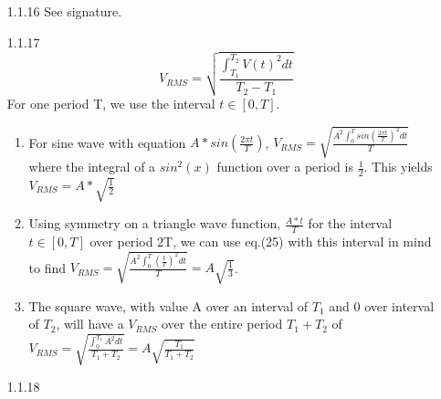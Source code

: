\documentclass{article}
\begin{document}
\begin{itemize}
    \item[1.1.16] See signature.
    \item[1.1.17]
    \begin{equation}
        V_{RMS} = \sqrt{\frac{\int_{T_1}^{T_2}V(t)^{2}dt}{T_2 - T_1}}
    \end{equation}
    For one period T, we use the interval $t\in[0,T]$.
    \begin{enumerate}[label=\alph*]
    \item For sine wave with equation $A*sin(\frac{2\pi t}{T})$, $V_{RMS} = \sqrt{\frac{A^{2}\int_{0}^{T}sin(\frac{2\pi t}{T})^{2}dt}{T}}$ where the integral of a $sin^{2}(x)$ function over a period is $\frac{1}{2}$. This yields $V_{RMS} = A*\sqrt{\frac{1}{2}}$
    \item Using symmetry on a triangle wave function, $\frac{A*t}{T}$ for the interval $t\in[0,T]$ over period 2T, we can use eq.(25) with this interval in mind to find $V_{RMS} = \sqrt{\frac{A^{2}\int_{0}^{T}(\frac{t}{T})^{2}dt}{T}} = A\sqrt{\frac{1}{3}}$.
    \item The square wave, with value A over an interval of $T_1$ and 0 over interval of $T_2$, will have a $V_{RMS}$ over the entire period $T_1 + T_2$ of  $V_{RMS} = \sqrt{\frac{\int_{0}^{T_1}{A^{2}dt}}{T_1 + T_2}} = A \sqrt{\frac{T_1}{T_1 + T_2}}$ \\
    \end{enumerate}
    \item[1.1.18] 
\end{itemize}
\end{document}
